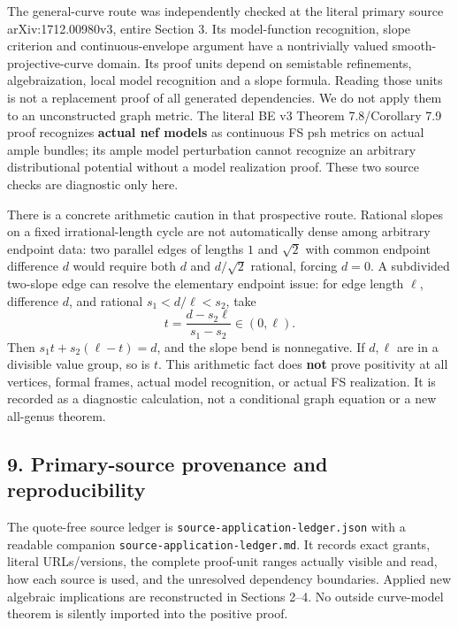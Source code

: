 \documentclass[
  11pt,
]{article}
\begin{document}
The general-curve route was independently checked at the literal primary
source arXiv:1712.00980v3, entire Section 3. Its model-function
recognition, slope criterion and continuous-envelope argument have a
nontrivially valued smooth-projective-curve domain. Its proof units
depend on semistable refinements, algebraization, local model
recognition and a slope formula. Reading those units is not a
replacement proof of all generated dependencies. We do not apply them to
an unconstructed graph metric. The literal BE v3 Theorem 7.8/Corollary
7.9 proof recognizes \textbf{actual nef models} as continuous FS psh
metrics on actual ample bundles; its ample model perturbation cannot
recognize an arbitrary distributional potential without a model
realization proof. These two source checks are diagnostic only here.

There is a concrete arithmetic caution in that prospective route.
Rational slopes on a fixed irrational-length cycle are not automatically
dense among arbitrary endpoint data: two parallel edges of lengths \(1\)
and \(\sqrt2\) with common endpoint difference \(d\) would require both
\(d\) and \(d/\sqrt2\) rational, forcing \(d=0\). A subdivided two-slope
edge can resolve the elementary endpoint issue: for edge length
\(\ell\), difference \(d\), and rational \(s_1<d/\ell<s_2\), take \[
t=\frac{d-s_2\ell}{s_1-s_2}\in(0,\ell).
\] Then \(s_1t+s_2(\ell-t)=d\), and the slope bend is nonnegative. If
\(d,\ell\) are in a divisible value group, so is \(t\). This arithmetic
fact does \textbf{not} prove positivity at all vertices, formal frames,
actual model recognition, or actual FS realization. It is recorded as a
diagnostic calculation, not a conditional graph equation or a new
all-genus theorem.

\subsection{9. Primary-source provenance and
reproducibility}\label{primary-source-provenance-and-reproducibility}

The quote-free source ledger is \texttt{source-application-ledger.json}
with a readable companion \texttt{source-application-ledger.md}. It
records exact grants, literal URLs/versions, the complete proof-unit
ranges actually visible and read, how each source is used, and the
unresolved dependency boundaries. Applied new algebraic implications are
reconstructed in Sections 2--4. No outside curve-model theorem is
silently imported into the positive proof.
\end{document}
